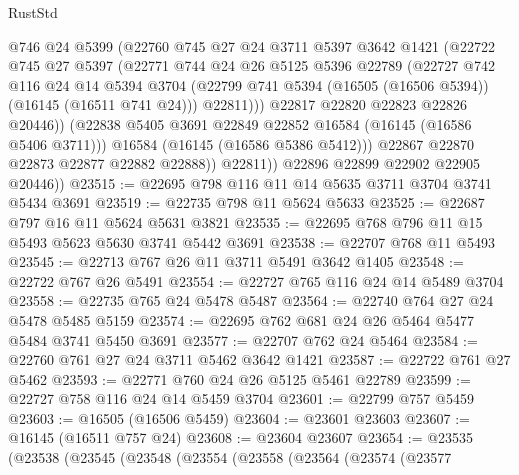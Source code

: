 \begin{lexlean}{RustStd}
\begin{coremodule}
                    @746
                    @24
                    @5399
                    (@22760
                      @745
                      @27
                      @24
                      @3711
                      @5397
                      @3642
                      @1421
                      (@22722
                        @745
                        @27
                        @5397
                        (@22771
                          @744
                          @24
                          @26
                          @5125
                          @5396
                          @22789
                          (@22727
                            @742
                            @116
                            @24
                            @14
                            @5394
                            @3704
                            (@22799 @741 @5394 (@16505 (@16506 @5394)) (@16145 (@16511 @741 @24)))
                            @22811)))
                      @22817
                      @22820
                      @22823
                      @22826
                      @20446))
                  (@22838 @5405 @3691 @22849 @22852 @16584 (@16145 (@16586 @5406 @3711)))
                  @16584
                  (@16145 (@16586 @5386 @5412)))
                @22867
                @22870
                @22873
                @22877
                @22882
                @22888))
            @22811))
        @22896
        @22899
        @22902
        @22905
        @20446))
@23515 := @22695 @798 @116 @11 @14 @5635 @3711 @3704 @3741 @5434 @3691
@23519 := @22735 @798 @11 @5624 @5633
@23525 := @22687 @797 @16 @11 @5624 @5631 @3821
@23535 := @22695 @768 @796 @11 @15 @5493 @5623 @5630 @3741 @5442 @3691
@23538 := @22707 @768 @11 @5493
@23545 := @22713 @767 @26 @11 @3711 @5491 @3642 @1405
@23548 := @22722 @767 @26 @5491
@23554 := @22727 @765 @116 @24 @14 @5489 @3704
@23558 := @22735 @765 @24 @5478 @5487
@23564 := @22740 @764 @27 @24 @5478 @5485 @5159
@23574 := @22695 @762 @681 @24 @26 @5464 @5477 @5484 @3741 @5450 @3691
@23577 := @22707 @762 @24 @5464
@23584 := @22760 @761 @27 @24 @3711 @5462 @3642 @1421
@23587 := @22722 @761 @27 @5462
@23593 := @22771 @760 @24 @26 @5125 @5461 @22789
@23599 := @22727 @758 @116 @24 @14 @5459 @3704
@23601 := @22799 @757 @5459
@23603 := @16505 (@16506 @5459)
@23604 := @23601 @23603
@23607 := @16145 (@16511 @757 @24)
@23608 := @23604 @23607
@23654 := @23535
    (@23538
      (@23545
        (@23548
          (@23554
            (@23558
              (@23564
                (@23574
                  (@23577

\end{coremodule}
\end{lexlean}
